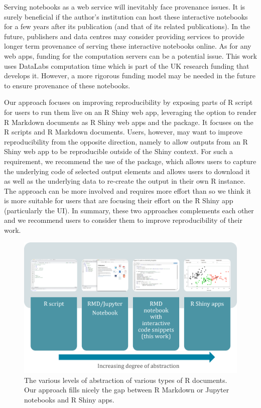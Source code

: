 Serving notebooks as a web service will inevitably face provenance
issues. It is surely beneficial if the author's institution can host
these interactive notebooks for a few years after its publication (and
that of its related publications). In the future, publishers and data
centres may consider providing services to provide longer term
provenance of serving these interactive notebooks online. As for any web
apps, funding for the computation servers can be a potential issue. This
work uses DataLabs computation time which is part of the UK research
funding that develops it. However, a more rigorous funding model may be
needed in the future to ensure provenance of these notebooks.

Our approach focuses on improving reproducibility by exposing parts of R
script for users to run them live on an R Shiny web app, leveraging the
option to render R Markdown documents as R Shiny web apps and the
 package. It focuses on the R scripts and R Markdown
documents. Users, however, may want to improve reproducibility from the
opposite direction, namely to allow outputs from an R Shiny web app to
be reproducible outside of the Shiny context. For such a requirement, we
recommend the use of the  \citep{shinymeta} package,
which allows users to capture the underlying code of selected output
elements and allows users to download it as well as the underlying data
to re-create the output in their own R instance. The 
approach can be more involved and requires more effort than
 so we think it is more suitable for users that are
focusing their effort on the R Shiny app (particularly the UI). In
summary, these two approaches complements each other and we recommend
users to consider them to improve reproducibility of their work.

\begin{Schunk}
\begin{figure}
\includegraphics[width=\textwidth]{learnr_abstraction} \caption[The various levels of abstraction of various types of R documents]{The various levels of abstraction of various types of R documents. Our approach fills nicely the gap between R Markdown or Jupyter notebooks and R Shiny apps.}\label{fig:fig1}
\end{figure}
\end{Schunk}

